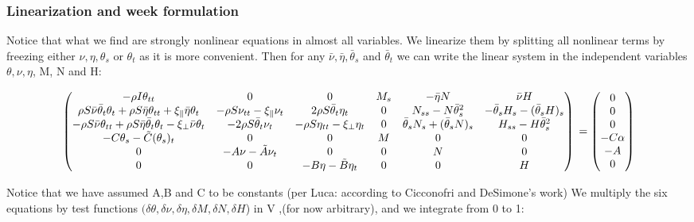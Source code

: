 
\usepackage{pdfsync}
\usepackage{amsmath}
\usepackage{graphicx}

\subsubsection{Linearization and week formulation}

Notice that what we find are strongly nonlinear equations in almost all variables.
We linearize them by splitting all nonlinear terms by freezing either $\nu, \eta, \theta_s$ or $\theta_t$ as it is more convenient. Then for any $\bar{\nu}, \bar{\eta}, \bar{\theta}_s$ and $\bar{\theta}_t$ we can write the linear system in the independent variables $\theta, \nu, \eta$, M, N and H:

\[\begin{pmatrix}
-\rho I \theta_{tt} & 0 & 0 & M_s & -\bar{\eta}N & \bar{\nu}H %
\\
\rho S\bar{\nu}\bar{\theta}_t\theta_t + \rho S \bar{\eta}\theta_{tt} + \xi_{\parallel}\bar{\eta}\theta_t & -\rho S \nu_{tt} -\xi_{\parallel}\nu_t & 2 \rho S\bar{\theta}_t\eta_t & 0 & N_{ss} - N\bar{\theta}_s^2 & -\bar{\theta}_s H_s - (\bar{\theta}_s H)_s 
\\
-\rho S \bar{\nu}\theta_{tt} + \rho S \bar{\eta}\bar{\theta}_t\theta_t - \xi_{\perp}\bar{\nu}\theta_t & - 2\rho S \bar{\theta}_t \nu_t & - \rho S \eta_{tt} - \xi_{\perp}\eta_t & 0 & \bar{\theta}_s N_s + (\bar{\theta}_s N)_s & H_{ss}-H\bar{\theta}_s^2 
\\
-C\theta_s -\tilde{C}(\theta_s)_t& 0 & 0 & M & 0 & 0 
\\
0 & -A\nu -\tilde{A}\nu_t & 0 & 0 & N & 0 
\\
0 & 0 & - B\eta - \tilde{B}\eta_t & 0 & 0 & H 
\end{pmatrix}
\\ =
\begin{pmatrix}
0\\
0\\
0\\
-C\alpha\\
-A\\
0
\end{pmatrix}\]

Notice that we have assumed A,B and C to be constants (per Luca: according to Cicconofri and DeSimone's work)
We multiply the six equations by test functions
$(\delta \theta, \delta\nu, \delta \eta, \delta M,\delta N, \delta H$) in V ,(for now arbitrary), and we integrate from 0 to 1: 

